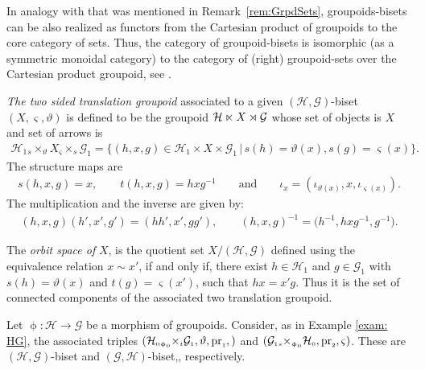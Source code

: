 \documentclass[pdftex]{sigma}
\numberwithin{equation}{section}
\newcommand{\Ga}{\cG_{\Sscript{1}}}
\newcommand{\Ho}{\cH_{\Sscript{0}}}
\newcommand{\Ha}{\cH_{\Sscript{1}}}
\newcommand{\cG}{{\mathcal G}}
\newcommand{\cH}{{\mathcal H}}
\newcommand{\Sscript}[1]{\scriptscriptstyle{#1}}
\newcommand{\due}[3]{{}_{{#2 }} {#1}_{{ #3}} }
\begin{document}
In analogy with that was mentioned in Remark~\ref{rem:GrpdSets}, groupoids-bisets can be also realized as functors from the Cartesian product of groupoids to the core category of sets. Thus, the category of groupoid-bisets is isomorphic (as a symmetric monoidal category) to the category of (right) groupoid-sets over the Cartesian product groupoid, see \cite[Proposition~3.12]{Kaoutit/Spinosa:2018}.

\emph{The two sided translation groupoid} associated to a given $(\cH, \cG)$-biset $(X,\varsigma, \vartheta)$ is defined to be the groupoid $\cH \lJoin X \rJoin \cG$ whose set of objects is $X$ and set of arrows is
\begin{gather*}
\cH_{\Sscript{1}} \due \times {\Sscript{{s}}} {\Sscript{\vartheta}} X \due \times {\Sscript{\varsigma}}{\Sscript{{s}}} \cG_{\Sscript{1}} = \big\{ (h,x,g) \in\cH_{\Sscript{1}}\times X \times \cG_{\Sscript{1}}\,|\, {s}(h)= \vartheta(x), {s}(g)=\varsigma(x) \big\}.
\end{gather*}
The structure maps are
\begin{gather*}
{s}(h,x,g)=x,\qquad {t}(h,x,g)=hxg^{-1}\qquad \text{and}\qquad \iota_{\Sscript{x}}=(\iota_{\Sscript{\vartheta(x)}}, x,\iota_{\Sscript{\varsigma(x)}}).
\end{gather*}
The multiplication and the inverse are given by:
\begin{gather*}
(h,x,g) (h',x',g') = (hh',x',gg'),\qquad (h,x,g)^{-1}=\big(h^{-1}, hxg^{-1}, g^{-1}\big).
\end{gather*}

The \emph{orbit space of} $X$, is the quotient set $X / (\cH,\cG)$ defined using the equivalence relation $x \sim x'$, if and only if, there exist $h \in \Ha$ and $g \in \Ga$ with $s(h)=\vartheta(x)$ and $t(g)=\varsigma(x')$, such that $hx = x'g$. Thus it is the set of connected components of the associated two translation groupoid.

\begin{Example}\label{exam:bisets}Let $\upphi\colon \cH \to \cG$ be a morphism of groupoids. Consider, as in Example \ref{exam: HG}, the associated triples $(\Ho \due \times {\Sscript{\upphi_0}} { \Sscript{t}} \Ga, \vartheta, {\rm pr}_{\Sscript{1}},)$ and $(\Ga \due \times {\Sscript{s}} { \Sscript{\upphi_0}} \Ho, {\rm pr}_{\Sscript{2}}, \varsigma)$. These are $(\cH, \cG)$-biset and $(\cG,\cH)$-biset,, respectively.
\end{Example}
\end{document}

